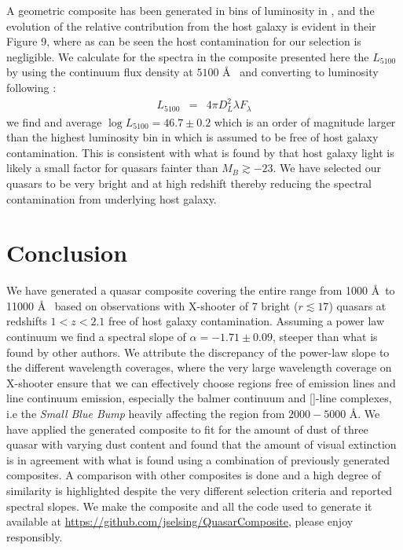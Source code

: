 \documentclass{aa}    %
\newcommand{\eqlabel}[1]{\label{eq:#1}}
\newcommand{\sectlabel}[1]{\label{sect:#1}}
\newcommand{\feii}{[\ion{Fe}{ii}]}
\begin{document}
A geometric composite has been generated in bins of luminosity in \citep{Shen2011}, and the evolution of the relative contribution from the host galaxy is evident in their Figure 9, where as can be seen the host contamination for our selection is negligible. We calculate for the spectra in the composite presented here the $L_{5100}$ by using the continuum flux density at $5100$ \AA~ and converting to luminosity following \cite{Netzer2007}:
\begin{eqnarray}\eqlabel{l5100}
L_{5100} &=&    4 \pi D_{L} ^{2} \lambda  F_{\lambda}
\end{eqnarray}
we find and average $\log L_{5100} = 46.7 \pm 0.2$ which is an order of magnitude larger than the highest luminosity bin in \cite{Shen2011} which is assumed to be free of host galaxy contamination. This
is consistent with what is found by \citep{Hopkins2007} that host galaxy light is likely a small factor for quasars fainter than $M_{B} \gtrsim -23$. We have selected our quasars to be very bright and at high redshift thereby reducing the spectral contamination from underlying host galaxy. 









\section{Conclusion}  \sectlabel{conclusion}




We have generated a quasar composite covering the entire range from 1000 \AA~to 11000 \AA~ based on observations with X-shooter of 7 bright ($r \lesssim 17$) quasars at redshifts $1 < z < 2.1$ free of host galaxy contamination. Assuming a power law continuum we find a spectral slope of $\alpha = -1.71 \pm 0.09$, steeper than what is found by other authors. We attribute the discrepancy of the power-law slope to the different wavelength coverages, where the very large wavelength coverage on X-shooter ensure that we can effectively choose regions free of emission lines and line continuum emission, especially the balmer continuum and \feii-line complexes, i.e the \textit{Small Blue Bump} heavily affecting the region from $2000 - 5000$ \AA. We have applied the generated composite to fit for the amount of dust of three quasar with varying dust content and found that the amount of visual extinction is in agreement with what is found using a combination of previously generated composites. A comparison with other composites is done and a high degree of similarity is highlighted despite the very different selection criteria and reported spectral slopes. We make the composite and all the code used to generate it available at \url{https://github.com/jselsing/QuasarComposite}, please enjoy responsibly.
\end{document}
